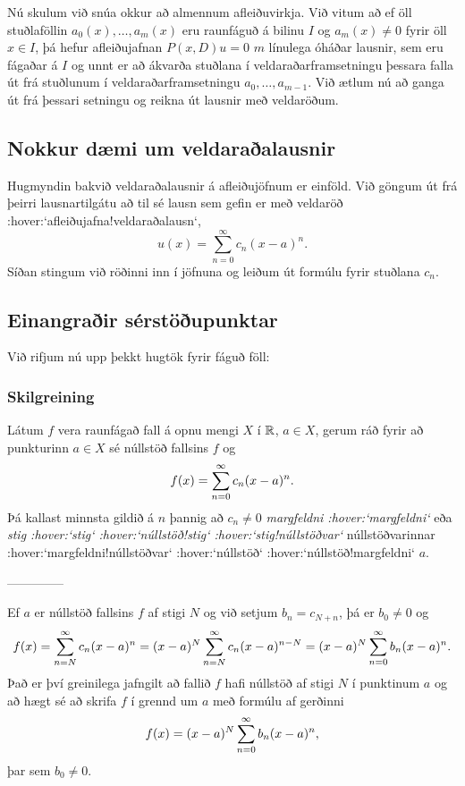 \noindent
Nú skulum við snúa okkur að almennum  afleiðuvirkja.
Við vitum    
að ef öll stuðlaföllin $a_0(x),\dots,a_{m}(x)$  eru
raunfáguð á bilinu $I$ og $a_m(x)\neq 0$ fyrir öll $x\in I$, 
þá hefur afleiðujafnan $P(x,D)u=0$
$m$ línulega óháðar lausnir, sem eru fágaðar á $I$ og
unnt er að ákvarða stuðlana í veldaraðarframsetningu þessara falla út
frá stuðlunum í veldaraðarframsetningu $a_0,\dots,a_{m-1}$.  
Við ætlum nú að ganga út frá þessari setningu og reikna út lausnir með 
veldaröðum.

\subsection*{Nokkur dæmi um veldaraðalausnir}

Hugmyndin bakvið veldaraðalausnir á afleiðujöfnum er einföld.  
Við göngum út frá þeirri lausnartilgátu að til sé lausn sem
gefin er með veldaröð :hover:`afleiðujafna!veldaraðalausn`,
$$
u(x)=\sum\limits_{n=0}^{\infty} c_n(x-a)^n.
$$
Síðan stingum við röðinni inn í jöfnuna og leiðum út formúlu fyrir
stuðlana $c_n$.  


\subsection*{Einangraðir sérstöðupunktar}

Við rifjum nú upp þekkt hugtök fyrir fáguð föll:

\subsubsection{Skilgreining}
Látum $f$ vera raunfágað fall á opnu mengi $X$ í ${\mathbb R}$, $a\in X$, gerum ráð
fyrir að punkturinn  $a\in X$ sé núllstöð fallsins $f$ og 
$$ f(x)=\sum_{n=0}\sp \infty c_n(x-a)\sp n. $$
Þá kallast minnsta gildið á $n$ þannig að $c_n\neq 0$ {\it
margfeldni :hover:`margfeldni`} eða
{\it stig :hover:`stig` :hover:`núllstöð!stig` :hover:`stig!núllstöðvar`}
núllstöðvarinnar :hover:`margfeldni!núllstöðvar`
 :hover:`núllstöð` :hover:`núllstöð!margfeldni` $a$.


--------------



Ef $a$ er núllstöð fallsins $f$ af stigi $N$ og við setjum
$b_n=c_{N+n}$, þá er $b_0\neq 0$ og
$$
f(x)=\sum_{n=N}\sp \infty c_n(x-a)\sp n=
(x-a)\sp N\sum_{n=N}\sp \infty c_n(x-a)\sp {n-N} =
(x-a)\sp N\sum_{n=0}\sp \infty b_n(x-a)\sp n.
$$
Það er því greinilega jafngilt að fallið $f$ hafi núllstöð af stigi
$N$ í punktinum $a$ og að hægt sé að skrifa $f$ í grennd um $a$ með
formúlu af gerðinni
$$ f(x)=(x-a)\sp N\sum_{n=0}\sp \infty b_n(x-a)\sp n, $$
þar sem $b_0\neq 0$.   

